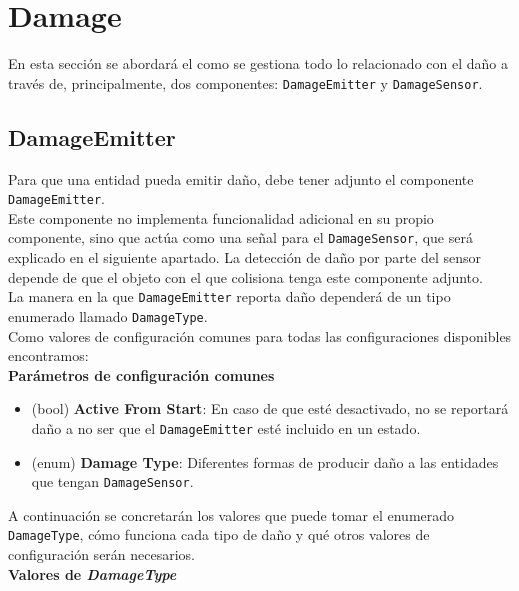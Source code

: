 \section{Damage}

En esta sección se abordará el como se gestiona todo lo relacionado con el daño a través de, principalmente, dos componentes: \texttt{DamageEmitter} y \texttt{DamageSensor}.

\subsection{DamageEmitter}
Para que una entidad pueda emitir daño, debe tener adjunto el componente \texttt{DamageEmitter}.\\
Este componente no implementa funcionalidad adicional en su propio componente, sino que actúa como una señal para el \texttt{DamageSensor}, que será explicado en el siguiente apartado. La detección de daño por parte del sensor depende de que el objeto con el que colisiona tenga este componente adjunto.\\

La manera en la que \texttt{DamageEmitter} reporta daño dependerá de un tipo enumerado llamado \texttt{DamageType}.\\
Como valores de configuración comunes para todas las configuraciones disponibles encontramos:\\

\textbf{Parámetros de configuración comunes}
\begin{itemize}
	\item (bool) \textbf{Active From Start}: En caso de que esté desactivado, no se reportará daño a no ser que el \texttt{DamageEmitter} esté incluido en un estado.
	\item (enum) \textbf{Damage Type}: Diferentes formas de producir daño a las entidades que tengan \texttt{DamageSensor}.
\end{itemize}

A continuación se concretarán los valores que puede tomar el enumerado \texttt{DamageType}, cómo funciona cada tipo de daño y qué otros valores de configuración serán necesarios.\\

\textbf{Valores de \textit{DamageType}}

